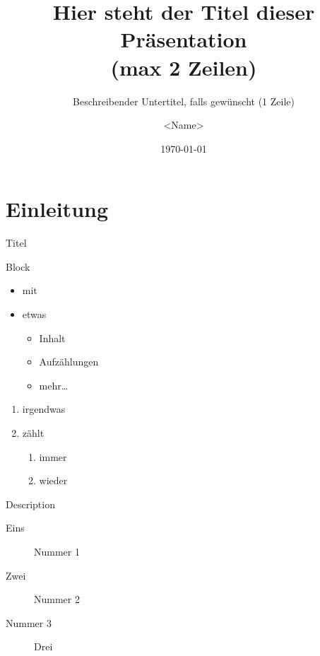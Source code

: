 \usepackage[utf8]{inputenc}
\usepackage[ngerman]{babel}
\usepackage{amsmath}
\usepackage{tikz}
\usepackage{etex}

\title[kurzer Titel]{Hier steht der Titel dieser Präsentation\\ (max 2 Zeilen)}
\subtitle{Beschreibender Untertitel, falls gewünscht (1 Zeile)}
\author[Kurzname]{\textless{}Name\textgreater}
\date{\today}



\begin{frame}[plain]
  \titlepage
\end{frame}


\section{Einleitung}

\begin{frame}{Titel}
  \begin{block}{Block}
    \begin{itemize}
      \item mit
      \item etwas
      \begin{itemize}
        \item Inhalt
        \item Aufzählungen
        \item mehr\dots
      \end{itemize}
    \end{itemize}
  \end{block}
\end{frame}


\begin{frame}
\begin{enumerate}
\item irgendwas
\item zählt
  \begin{enumerate}
  \item immer
  \item wieder
  \end{enumerate}
\end{enumerate}
\end{frame}

\begin{frame}{Description}
\begin{description}
  \item[Eins] Nummer 1
  \item[Zwei] Nummer 2
  \item[Nummer 3] Drei
\end{description}
\end{frame}

